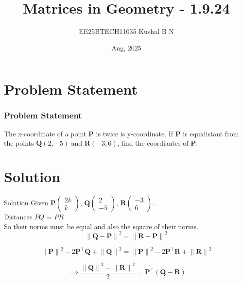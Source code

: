 \documentclass{beamer}
\title{Matrices in Geometry - 1.9.24}
\author{EE25BTECH11035  Kushal B N}
\date{Aug, 2025}
\let\vec\mathbf
\providecommand{\brak}[1]{\ensuremath{\left(#1\right)}}
\theoremstyle{remark}
\providecommand{\norm}[1]{\lVert#1\rVert}
\newcommand{\myvec}[1]{\ensuremath{\begin{pmatrix}#1\end{pmatrix}}}
\begin{document}
\maketitle


\begin{frame}
\tableofcontents
\end{frame}

\section{Problem Statement}
\begin{frame}
\frametitle{Problem Statement}
The x-coordinate of a point $\vec{P}$ is twice is y-coordinate. If $\vec{P}$ is equidistant from the points $\vec{Q}$$\brak{2,-5}$ and $\vec{R}$$\brak{-3,6}$, find the coordiantes of $\vec{P}$.
\end{frame}

\section{Solution}
\begin{frame}{Solution}
   Given $\vec{P}$$\myvec{2k\\k}$, $\vec{Q}\myvec{2\\-5}$, $\vec{R}\myvec{-3\\6}$.\\
   Distances $PQ$ = $PR$ \\
   So their norms must be equal and also the square of their norms.
   \begin{equation}
	   {\norm{\vec{Q}-\vec{P}}}^{2} = {\norm{\vec{R}-\vec{P}}}^2
   \end{equation}

\begin{equation}
    {\norm{\vec{P}}}^2 - 2\vec{P}^{\top}\vec{Q} + {\norm{\vec{Q}}}^2 = {\norm{\vec{P}}}^2 - 2\vec{P}^{\top}\vec{R} + {\norm{\vec{R}}}^2
\end{equation}

\begin{equation}
    \implies \frac{{\norm{\vec{Q}}}^2 - {\norm{\vec{R}}}^2}{2} = \vec{P}^{\top}\brak{\vec{Q}-\vec{R}}
\end{equation}
    
\end{frame}
\end{document}

